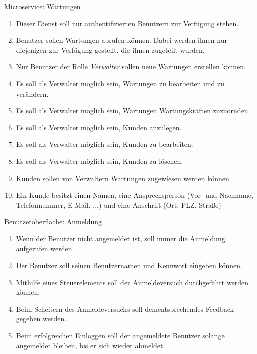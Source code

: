 \documentclass[12pt]{scrreprt}
\newcommand{\itemh}[1]{{\bfseries\large\item #1}}
\begin{document}
\begin{enumerate}
    \itemh{Microservice: Wartungen}
    \begin{enumerate}
      \item Dieser Dienst soll nur authentifizierten Benutzern zur Verfügung stehen.
      \item Benutzer sollen Wartungen abrufen können. Dabei werden ihnen nur diejenigen zur Verfügung gestellt, die
        ihnen zugeteilt wurden.
      \item Nur Benutzer der Rolle \textit{Verwalter} sollen neue Wartungen erstellen können.
      \item Es soll als Verwalter möglich sein, Wartungen zu bearbeiten und zu verändern.
      \item Es soll als Verwalter möglich sein, Wartungen Wartungskräften zuzuornden.
      \item Es soll als Verwalter möglich sein, Kunden anzulegen.
      \item Es soll als Verwalter möglich sein, Kunden zu bearbeiten.
      \item Es soll als Verwalter möglich sein, Kunden zu löschen.
      \item Kunden sollen von Verwaltern Wartungen zugewiesen werden können.
      \item Ein Kunde besitzt einen Namen, eine Ansprechsperson (Vor- und Nachname, Telefonnummer, E-Mail, ...) und eine
        Anschrift (Ort, PLZ, Straße)
    \end{enumerate}

    \itemh{Benutzeroberfläche: Anmeldung}
    \begin{enumerate}
      \item Wenn der Benutzer nicht angemeldet ist, soll immer die Anmeldung aufgerufen werden.
      \item Der Benutzer soll seinen Benutzernamen und Kennwort eingeben können.
      \item Mithilfe eines Steuerelements soll der Anmeldeversuch durchgeführt werden können.
      \item Beim Scheitern des Anmeldeversuchs soll dementsprechendes Feedback gegeben werden.
      \item Beim erfolgreichen Einloggen soll der angemeldete Benutzer solange angemeldet bleiben, bis er sich wieder
        abmeldet.
    \end{enumerate}


\end{enumerate}
\end{document}
